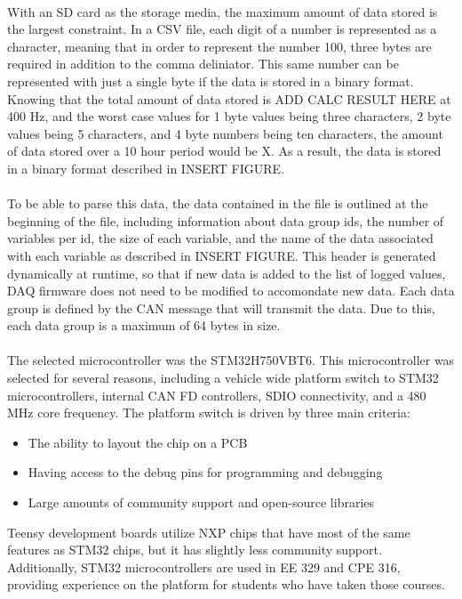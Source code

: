 \paragraph{}
With an SD card as the storage media, the maximum amount of data stored is the largest constraint.
In a CSV file, each digit of a number is represented as a character, meaning that in order to represent the number 100, three bytes are required in addition to the comma deliniator.
This same number can be represented with just a single byte if the data is stored in a binary format.
Knowing that the total amount of data stored is ADD CALC RESULT HERE at 400 Hz, and the worst case values for 1 byte values being three characters, 2 byte values being 5 characters, and 4 byte numbers being ten characters, the amount of data stored over a 10 hour period would be X.
As a result, the data is stored in a binary format described in INSERT FIGURE.

\paragraph{}
To be able to parse this data, the data contained in the file is outlined at the beginning of the file, including information about data group ids, the number of variables per id, the size of each variable, and the name of the data associated with each variable as described in INSERT FIGURE.
This header is generated dynamically at runtime, so that if new data is added to the list of logged values, DAQ firmware does not need to be modified to accomondate new data.
Each data group is defined by the CAN message that will transmit the data.
Due to this, each data group is a maximum of 64 bytes in size.

\paragraph{}
The selected microcontroller was the STM32H750VBT6.
This microcontroller was selected for several reasons, including a vehicle wide platform switch to STM32 microcontrollers, internal CAN FD controllers, SDIO connectivity, and a 480 MHz core frequency.
The platform switch is driven by three main criteria:
\begin{itemize}
	\item The ability to layout the chip on a PCB
	\item Having access to the debug pins for programming and debugging
	\item Large amounts of community support and open-source libraries
\end{itemize}
Teensy development boards utilize NXP chips that have most of the same features as STM32 chips, but it has slightly less community support.
Additionally, STM32 microcontrollers are used in EE 329 and CPE 316, providing experience on the platform for students who have taken those courses.

